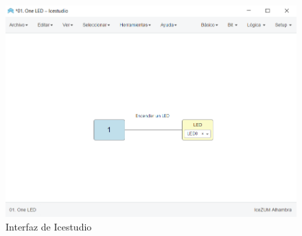 \vspace{5mm}

\begin{figure}[H]
	\center
	\includegraphics[scale=0.8]{imagenes/Herramientas/ice.png}
	\caption{Interfaz de Icestudio}
	\label{fig:Icestudio}
\end{figure}



